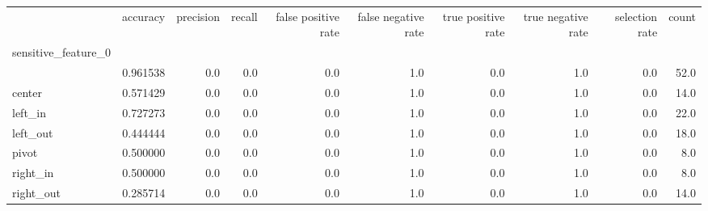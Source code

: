 \begin{tabular}{lrrrrrrrrr}
\toprule
{} &  accuracy &  precision &  recall &  false positive rate &  false negative rate &  true positive rate &  true negative rate &  selection rate &  count \\
sensitive\_feature\_0 &           &            &         &                      &                      &                     &                     &                 &        \\
\midrule
                    &  0.961538 &        0.0 &     0.0 &                  0.0 &                  1.0 &                 0.0 &                 1.0 &             0.0 &   52.0 \\
center              &  0.571429 &        0.0 &     0.0 &                  0.0 &                  1.0 &                 0.0 &                 1.0 &             0.0 &   14.0 \\
left\_in             &  0.727273 &        0.0 &     0.0 &                  0.0 &                  1.0 &                 0.0 &                 1.0 &             0.0 &   22.0 \\
left\_out            &  0.444444 &        0.0 &     0.0 &                  0.0 &                  1.0 &                 0.0 &                 1.0 &             0.0 &   18.0 \\
pivot               &  0.500000 &        0.0 &     0.0 &                  0.0 &                  1.0 &                 0.0 &                 1.0 &             0.0 &    8.0 \\
right\_in            &  0.500000 &        0.0 &     0.0 &                  0.0 &                  1.0 &                 0.0 &                 1.0 &             0.0 &    8.0 \\
right\_out           &  0.285714 &        0.0 &     0.0 &                  0.0 &                  1.0 &                 0.0 &                 1.0 &             0.0 &   14.0 \\
\bottomrule
\end{tabular}
